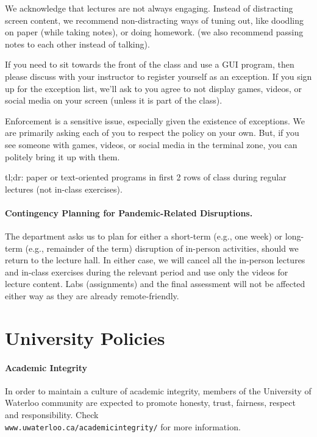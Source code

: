 \documentclass[letterpaper,10pt]{article}
\begin{document}
We acknowledge that lectures are not always engaging. Instead of
distracting screen content, we recommend non-distracting ways of tuning
out, like doodling on paper (while taking notes), or doing homework.
(we also recommend passing notes to each other instead of talking).

If you need to sit towards the front of the class and use a GUI
program, then please discuss with your instructor to register
yourself as an exception. If you sign up for
the exception list, we'll ask to you agree to not display games,
videos, or social media on your screen (unless it is part of the
class).

Enforcement is a sensitive issue, especially given the existence of
exceptions. We are primarily asking each of you to respect the policy
on your own. But, if you see someone with games, videos, or social
media in the terminal zone, you can politely bring it up with them.

tl;dr: paper or text-oriented programs in first 2 rows of class during regular lectures (not in-class exercises).

\paragraph{Contingency Planning for Pandemic-Related Disruptions.}
The department asks us to plan for either a short-term (e.g., one week) or long-term (e.g., remainder of the term) disruption of in-person activities, should we return to the lecture hall. In either case, we will cancel all the in-person lectures and in-class exercises during the relevant period and use only the videos for lecture content. Labs (assignments) and the final assessment will not be affected either way as they are already remote-friendly.

\section*{University Policies}

\paragraph{Academic Integrity}
In order to maintain a culture of academic integrity, members of the University of Waterloo community are expected to promote honesty, trust, fairness, respect and responsibility. Check\\
\texttt{www.uwaterloo.ca/academicintegrity/} for more information.
\end{document}
